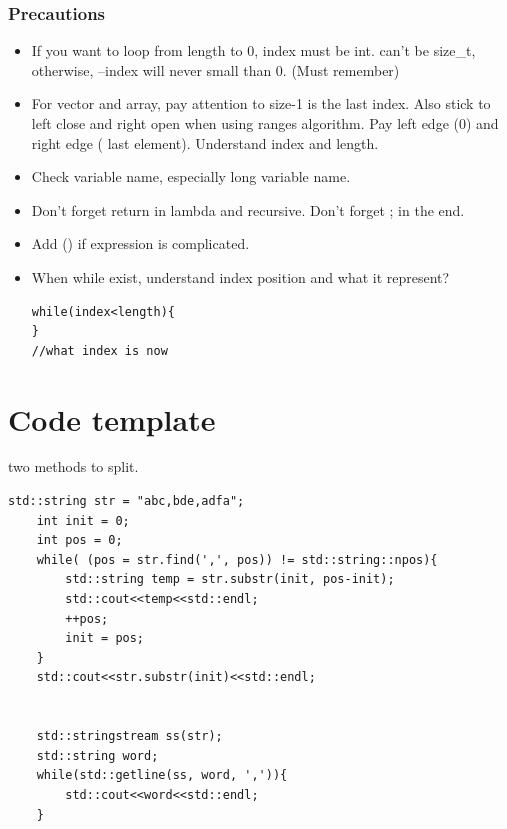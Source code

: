 \documentclass[a4paper,11pt,twoside]{book}
\begin{document}
\subsubsection{Precautions}
\begin{itemize}
\begin{lstlisting}
std::generate(answer.begin(), answer.end(), [&v, i = 0](){ return v[v[i++]]; }) i dones't need int

std::set<int> s(std::from_range, v); //usage of from_range
\end{lstlisting}

	\item If you want to loop from length to 0, index must be int. can't be size\_t, otherwise, --index will never small than 0. (Must remember)
	
	\item For vector and array, pay attention to size-1 is the last index. Also stick to left close and right open when using ranges algorithm. Pay left edge (0) and right edge ( last element). Understand index and length. 
	
	\item Check variable name, especially long variable name. 
	
	\item Don't forget return in lambda and recursive. Don't forget ; in the end. 
	
	\item Add () if expression is complicated. 
	
	\item When while exist, understand index position and what it represent?
	
\begin{lstlisting}
while(index<length){
}
//what index is now		
\end{lstlisting}	
	
\end{itemize}



\section{Code template}


\par two methods to split.

\begin{lstlisting}
std::string str = "abc,bde,adfa";
    int init = 0;
    int pos = 0;
    while( (pos = str.find(',', pos)) != std::string::npos){
        std::string temp = str.substr(init, pos-init);
        std::cout<<temp<<std::endl;
        ++pos;
        init = pos;
    }
    std::cout<<str.substr(init)<<std::endl;


    std::stringstream ss(str);
    std::string word;
    while(std::getline(ss, word, ',')){
        std::cout<<word<<std::endl;
    }
\end{lstlisting}
\end{document}
